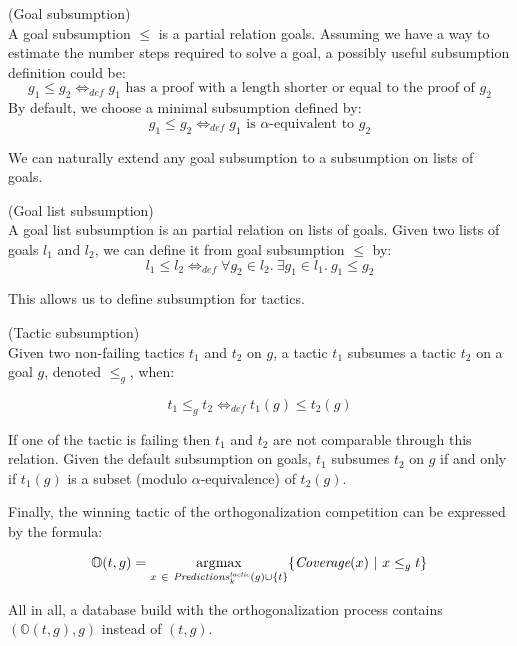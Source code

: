 \documentclass[runningheads,a4paper,draft]{svjour3}
\DeclareMathOperator*{\argmax}{\arg\!\max}
\begin{document}
\begin{definition} (Goal subsumption)\\
A goal subsumption $\le$ is a partial relation goals.
Assuming we have a way to estimate the number steps required to solve a goal,
a possibly useful subsumption definition could be:
\[g_1 \le g_2  \Leftrightarrow_{def} g_1 \mbox{ has a proof with a length
shorter
or equal to the proof of }
g_2\]
By default, we choose a minimal subsumption defined by:
\[g_1 \le g_2  \Leftrightarrow_{def} g_1 \mbox{ is }\alpha\mbox{-equivalent
to } g_2\]
\end{definition}

We can naturally extend any goal subsumption to a subsumption on
lists of goals.
\begin{definition} (Goal list subsumption)\\
A goal list subsumption is an partial relation on lists of goals.
Given two lists of goals $l_1$ and $l_2$, we can define it from goal
subsumption $\le$ by:
\[l_1 \le l_2  \Leftrightarrow_{def} \forall g_2 \in l_2.\ \exists g_1 \in l_1.\
g_1 \le g_2\]
\end{definition}

This allows us to define subsumption for tactics.
\begin{definition}\label{def:tacsub}(Tactic subsumption)\\
Given two non-failing tactics $t_1$ and $t_2$ on $g$, a tactic $t_1$ subsumes a
tactic $t_2$ on a goal $g$, denoted $\le_g$, when:

 \[t_1 \le_g t_2 \Leftrightarrow_{def} t_1(g) \le t_2(g)\]

If one of the tactic is failing then $t_1$ and $t_2$ are not comparable through
this relation.
Given the default subsumption on goals, $t_1$ subsumes $t_2$ on $g$ if and only
if $t_1(g)$ is a subset (modulo $\alpha$-equivalence) of $t_2(g)$.
\end{definition}

Finally, the winning tactic of the orthogonalization competition can be
expressed by the formula:

\[\mathbb{O}(t,g) = \argmax_{x\ \in\
\mathit{Predictions}^{\mathit{tactic}}_k(g) \cup
\lbrace t
\rbrace} \lbrace
\textit{\mbox{Coverage}}(x)\
|\ x \le_g t\rbrace\]

All in all, a database build with the orthogonalization process contains
$(\mathbb{O}(t,g),g)$ instead of $(t,g)$.
\end{document}
